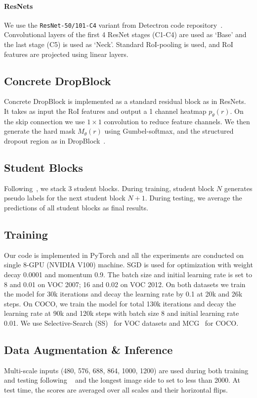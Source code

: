 \documentclass[10pt,twocolumn,letterpaper]{article}
\begin{document}
\paragraph{ResNets} We use the \texttt{ResNet-50/101-C4} variant from Detectron code repository~\cite{Detectron2018}. Convolutional layers of the first 4 ResNet stages (C1-C4) are used as `Base' and the last stage (C5) is used as `Neck'. Standard RoI-pooling is used, and RoI features are projected using linear layers.

\subsection{Concrete DropBlock}
Concrete DropBlock is implemented as a standard residual block as in ResNets. It takes as input the RoI features and output a 1 channel heatmap $p_\theta(r)$. On the skip connection we use $1\times 1$ convolution to reduce feature channels. We then generate the hard mask $M_\theta(r)$ using Gumbel-softmax, and the structured dropout region as in DropBlock~\cite{dropblock}.

\subsection{Student Blocks}
Following~\cite{tang2017multiple}, we stack 3 student blocks. During training, student block $N$ generates pseudo labels for the next student block $N+1$. During testing, we average the predictions of all student blocks as final results.

\subsection{Training}
Our code is implemented in PyTorch and all the experiments are conducted on single 8-GPU (NVIDIA V100) machine. SGD is used for optimization with weight decay 0.0001 and momentum 0.9. The batch size and initial learning rate is set to 8 and 0.01 on VOC 2007; 16 and 0.02 on VOC 2012. On both datasets we train the model for 30k iterations and decay the learning rate by 0.1 at 20k and 26k steps. On COCO, we train the model for total 130k iterations and decay the learning rate at 90k and 120k steps with batch size 8 and initial learning rate 0.01. We use Selective-Search (SS)~\cite{ss} for VOC datasets and MCG~\cite{mcg} for COCO.

\subsection{Data Augmentation \& Inference}
Multi-scale inputs (480, 576, 688, 864, 1000, 1200) are used during both  training and testing following ~\cite{tang2017multiple,KantorovOCL16} and the longest image side to set to less than 2000.
At test time, the scores are averaged over all scales and their horizontal flips. 
\end{document}
